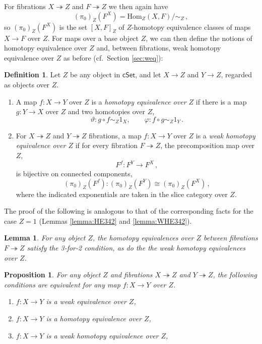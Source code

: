 \documentclass[11pt,reqno]{amsart}
\newcommand{\cSet}{\ensuremath{\mathsf{cSet}}}
\newcommand{\ra}{\ensuremath{\rightarrow}}
\newcommand{\fib}{\ensuremath{\twoheadrightarrow}}
\renewcommand{\to}{\ensuremath{\rightarrow}}
\renewcommand{\hom}{\ensuremath{\mathrm{Hom}}}
\newtheorem{proposition}[theorem]{Proposition}
\newtheorem{lemma}[theorem]{Lemma}
\theoremstyle{remark}
\theoremstyle{definition}
\newtheorem{definition}[theorem]{Definition}
\begin{document}
For fibrations $X\fib Z$ and $F\fib Z$ we then again have 
\[
(\pi_0)_Z(F^X) = \hom_{Z}(X,F)/\!\!\sim_Z\,,
\]  
so $(\pi_0)_Z(F^X)$ is the set  $[X, F]_Z$ of $Z$-homotopy equivalence classes of maps $X\ra F$ over $Z$.
For maps over a base object $Z$, we can then define the notions of homotopy equivalence over $Z$ and, between fibrations, weak homotopy equivalence over $Z$ as before (cf.~Section \ref{sec:weq}):

\begin{definition}\label{def:slicedhewe}
Let $Z$ be any object in $\cSet$, and let $X \to Z$ and $Y \to Z$, regarded as objects over $Z$.
%
\begin{enumerate}
%
\item A map $f : X\to Y$ over $Z$ is a \emph{homotopy equivalence over $Z$} 
if there is a map $g : Y\to X$ over $Z$ and two homotopies over $Z$,
\[
\vartheta : g\circ f \sim_Z 1_X,\qquad \varphi : f\circ g \sim_Z 1_Y\,.
\]
%
\item For $X\fib Z$ and $Y\fib Z$ fibrations, a map $f : X\to Y$ over $Z$ is a \emph{weak homotopy equivalence over $Z$} if for every fibration $F\fib Z$, the precomposition map over $Z$,
\[
F^f : F^Y \to F^X\,,
\]
is bijective on connected components, 
\[
(\pi_0)_Z(F^f) : (\pi_0)_Z(F^Y) \cong (\pi_0)_Z(F^X)\,,
\]
where the indicated exponentials are taken in the slice category over $Z$. 
\end{enumerate}
\end{definition} 

The proof of the following is analogous to that of the corresponding facts for the case $Z=1$ (Lemmas \ref{lemma:HE342} and \ref{lemma:WHE342}).

\begin{lemma}\label{lemma:HE342sliced}
For any object $Z$, the homotopy equivalences over $Z$ between fibrations $F\fib Z$ satisfy the 3-for-2 condition, as do the the weak homotopy equivalences over $Z$.
\end{lemma}

\begin{proposition}\label{prop:weqisheoverZ}
For any object $Z$ and fibrations $X\fib Z$ and $Y\fib Z$, the following conditions are equivalent for any map $f : X\to Y$ over $Z$.
\begin{enumerate}
\item $f : X\to Y$ is a weak equivalence over $Z$,
\item $f : X\to Y$ is a homotopy equivalence over $Z$, 
\item $f : X\to Y$ is a weak homotopy equivalence over $Z$, 
 \end{enumerate}
\end{proposition}
\end{document}
